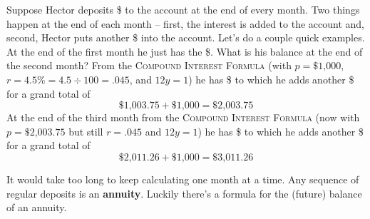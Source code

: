 Suppose Hector deposits \$ to the account at the end of every month.  Two things happen at the end of each month -- first, the interest is added to the account and, second, Hector puts another \$ into the account. Let's do a couple quick examples.  At the end of the first month he just has the \$.  What is his balance at the end of the second month? From the \textsc{Compound Interest Formula} (with $p=\$\text{1,000}$, $r=4.5\% = 4.5 \div 100 = .045$, and $12y=1$) he has \$ to which he adds another \$ for a grand total of 
$$ \$\text{1,003.75}+  \$\text{1,000}= \$\text{2,003.75}$$
At the end of the third month from the \textsc{Compound Interest Formula} (now with $p=\$\text{2,003.75}$ but still $r=.045$ and $12y=1$) he has \$ to which he adds another \$ for a grand total of 
$$\$\text{2,011.26} + \$\text{1,000} = \$\text{3,011.26}$$


It would take too long to keep calculating one month at a time.  Any sequence of regular deposits is an \textbf{annuity}.  Luckily there's a formula for the (future) balance of an annuity. 

 \bigskip
\bigskip

